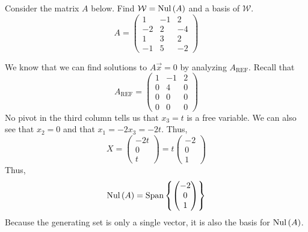 \begin{example}{}{}
    Consider the matrix $A$ below. Find $\mathcal{W}=\text{Nul}\left(A\right)$ and a basis of $\mathcal{W}$.
    \[
        A = \begin{pmatrix}
            1 & -1 & 2 \\
            -2 & 2 & -4 \\
            1 & 3 & 2 \\
            -1 & 5 & -2
        \end{pmatrix} 
    \]

    \begin{solution}
        We know that we can find solutions to $A\vec{x}=0$ by analyzing $A_{\text{REF}}$. Recall that 
        \[
            A_{\text{REF}} =  
            \begin{pmatrix}
                1 & -1 & 2 \\
                0 & 4 & 0 \\
                0 & 0 & 0 \\
                0 & 0 & 0
            \end{pmatrix}
        \]
        No pivot in the third column tells us that $x_3=t$ is a free variable. We can also see that $x_2=0$ and that $x_1 = -2x_3 = -2t$. Thus, 
        \[
            X = \begin{pmatrix}
                -2t \\ 0 \\ t
            \end{pmatrix}
            = t\begin{pmatrix}
                -2 \\ 0 \\ 1
            \end{pmatrix}
        \]
        Thus, 
        \[
            \text{Nul}\left(A\right) = \text{Span}\left\{\begin{pmatrix}
                -2 \\ 0 \\ 1
            \end{pmatrix} \right\}
        \]
        Because the generating set is only a single vector, it is also the basis for $\text{Nul}\left(A\right)$.
    \end{solution}
\end{example}

